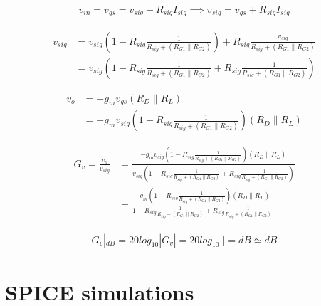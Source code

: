 \documentclass[10pt,a4paper]{book}
\begin{document}
\begin{align}
v_{in} = v_{gs} = v_{sig} - R_{sig} I_{sig} \implies v_{sig} = v_{gs} + R_{sig} I_{sig}
\end{align}

\begin{align}
v_{sig} &= v_{sig} \left(1 - R_{sig} \frac{1}{R_{sig} + (R_{G1} \parallel R_{G2})}\right) + R_{sig} \frac{v_{sig}}{R_{sig} + (R_{G1} \parallel R_{G2})}\\
&= v_{sig} \left(1 - R_{sig} \frac{1}{R_{sig} + (R_{G1} \parallel R_{G2})} + R_{sig} \frac{1}{R_{sig} + (R_{G1} \parallel R_{G2})}\right)
\end{align}

\begin{align}
v_{o} &= - g_m v_{gs} (R_D \parallel R_L)\\
&= -g_m v_{sig} \left(1 - R_{sig} \frac{1}{R_{sig} + (R_{G1} \parallel R_{G2})}\right) (R_D \parallel R_L)
\end{align}

\begin{align}
G_v = \frac{v_o}{v_{sig}} &= \frac{-g_m v_{sig} \left(1 - R_{sig} \frac{1}{R_{sig} + (R_{G1} \parallel R_{G2})}\right) (R_D \parallel R_L)}{v_{sig} \left(1 - R_{sig} \frac{1}{R_{sig} + (R_{G1} \parallel R_{G2})} + R_{sig} \frac{1}{R_{sig} + (R_{G1} \parallel R_{G2})}\right)}\\
&= \frac{-g_m \left(1 - R_{sig} \frac{1}{R_{sig} + (R_{G1} \parallel R_{G2})}\right) (R_D \parallel R_L)}{1 - R_{sig} \frac{1}{R_{sig} + (R_{G1} \parallel R_{G2})} + R_{sig} \frac{1}{R_{sig} + (R_{G1} \parallel R_{G2})}}
\end{align}

\begin{align}
G_v|_{dB} = 20 log_{10} |G_v| = 20 log_{10} || = dB \simeq  dB
\end{align}

\chapter{SPICE simulations}
\end{document}

